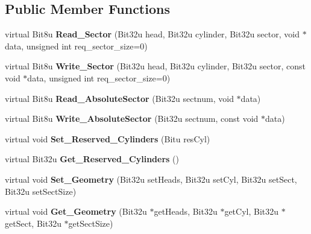 \subsection*{Public Member Functions}
\begin{DoxyCompactItemize}
\item 
\hypertarget{classimageDisk_ad4933bb3260424d36ebe4b28c12eb803}{virtual Bit8u {\bfseries Read\-\_\-\-Sector} (Bit32u head, Bit32u cylinder, Bit32u sector, void $\ast$data, unsigned int req\-\_\-sector\-\_\-size=0)}\label{classimageDisk_ad4933bb3260424d36ebe4b28c12eb803}

\item 
\hypertarget{classimageDisk_a0a111a8f6bd1f2c85bcec61ae45fe5c6}{virtual Bit8u {\bfseries Write\-\_\-\-Sector} (Bit32u head, Bit32u cylinder, Bit32u sector, const void $\ast$data, unsigned int req\-\_\-sector\-\_\-size=0)}\label{classimageDisk_a0a111a8f6bd1f2c85bcec61ae45fe5c6}

\item 
\hypertarget{classimageDisk_ae9120b70c021262b85e3db96f7100113}{virtual Bit8u {\bfseries Read\-\_\-\-Absolute\-Sector} (Bit32u sectnum, void $\ast$data)}\label{classimageDisk_ae9120b70c021262b85e3db96f7100113}

\item 
\hypertarget{classimageDisk_a12ba56c45b2a21e74a96c5c111e7a848}{virtual Bit8u {\bfseries Write\-\_\-\-Absolute\-Sector} (Bit32u sectnum, const void $\ast$data)}\label{classimageDisk_a12ba56c45b2a21e74a96c5c111e7a848}

\item 
\hypertarget{classimageDisk_a3aadaa8e63427e74072b9af40f1c1976}{virtual void {\bfseries Set\-\_\-\-Reserved\-\_\-\-Cylinders} (Bitu res\-Cyl)}\label{classimageDisk_a3aadaa8e63427e74072b9af40f1c1976}

\item 
\hypertarget{classimageDisk_a725dcaa170dba2b9895fa0c3c56df363}{virtual Bit32u {\bfseries Get\-\_\-\-Reserved\-\_\-\-Cylinders} ()}\label{classimageDisk_a725dcaa170dba2b9895fa0c3c56df363}

\item 
\hypertarget{classimageDisk_a042237c8931cc681960e5eb19e6dc45f}{virtual void {\bfseries Set\-\_\-\-Geometry} (Bit32u set\-Heads, Bit32u set\-Cyl, Bit32u set\-Sect, Bit32u set\-Sect\-Size)}\label{classimageDisk_a042237c8931cc681960e5eb19e6dc45f}

\item 
\hypertarget{classimageDisk_a0af6f2540953debaf43c20d5a597562b}{virtual void {\bfseries Get\-\_\-\-Geometry} (Bit32u $\ast$get\-Heads, Bit32u $\ast$get\-Cyl, Bit32u $\ast$get\-Sect, Bit32u $\ast$get\-Sect\-Size)}\label{classimageDisk_a0af6f2540953debaf43c20d5a597562b}


\end{DoxyCompactItemize}
